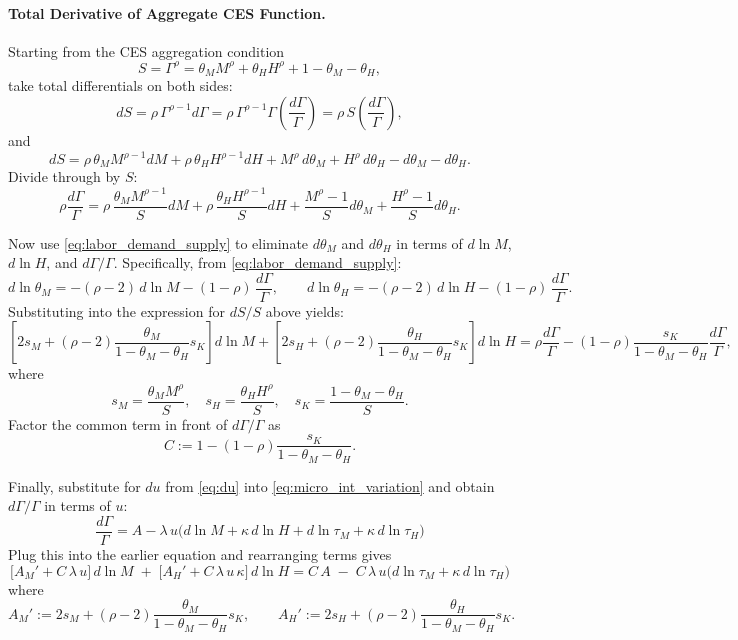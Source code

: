 \documentclass[english]{article}
\begin{document}
\paragraph{Total Derivative of Aggregate CES Function.}
Starting from the CES aggregation condition
\[
S = \Gamma^\rho = \theta_M M^\rho + \theta_H H^\rho + 1 - \theta_M - \theta_H,
\]
take total differentials on both sides:
\[
dS
= \rho\,\Gamma^{\rho-1} d\Gamma
= \rho\,\Gamma^{\rho-1} \Gamma \left( \frac{d\Gamma}{\Gamma} \right)
= \rho\,S \left( \frac{d\Gamma}{\Gamma} \right),
\]
and
\[
dS
= \rho\,\theta_M M^{\rho-1} dM + \rho\,\theta_H H^{\rho-1} dH
+ M^\rho\,d\theta_M + H^\rho\,d\theta_H - d\theta_M - d\theta_H.
\]
Divide through by \(S\):
\[
\rho \frac{d\Gamma}{\Gamma}
= \rho\,\frac{\theta_M M^{\rho-1}}{S} dM + \rho\,\frac{\theta_H H^{\rho-1}}{S} dH
+ \frac{M^\rho - 1}{S} d\theta_M + \frac{H^\rho - 1}{S} d\theta_H.
\]

Now use \eqref{eq:labor_demand_supply} to eliminate
\(d\theta_M\) and \(d\theta_H\) in terms of \(d\ln M\), \(d\ln H\), and \(d\Gamma/\Gamma\).  
Specifically, from \eqref{eq:labor_demand_supply}:
\begin{equation}
d\ln\theta_M = -(\rho-2)\,d\ln M - (1-\rho)\,\frac{d\Gamma}{\Gamma},
\qquad
d\ln\theta_H = -(\rho-2)\,d\ln H - (1-\rho)\,\frac{d\Gamma}{\Gamma}. \label{eq:d_theta}
\end{equation}
Substituting into the expression for \(dS/S\) above yields:
\[
\left[ 2s_M + (\rho-2)\frac{\theta_M}{1-\theta_M-\theta_H}s_K \right] d\ln M
+ \left[ 2s_H + (\rho-2)\frac{\theta_H}{1-\theta_M-\theta_H}s_K \right] d\ln H
= \rho\frac{d\Gamma}{\Gamma} - (1-\rho)\frac{s_K}{1-\theta_M-\theta_H} \frac{d\Gamma}{\Gamma},
\]
where 
\begin{equation}
s_M = \frac{\theta_M M^\rho}{S}, \quad
s_H = \frac{\theta_H H^\rho}{S}, \quad 
s_K = \frac{1-\theta_M-\theta_H}{S}. \label{eq:s_def}
\end{equation}
Factor the common term in front of \(d\Gamma/\Gamma\) as
\begin{equation}
C := 1 - (1-\rho)\frac{s_K}{1-\theta_M-\theta_H}. \label{eq:C_def}
\end{equation}

Finally, substitute for $du$ from \eqref{eq:du} into \eqref{eq:micro_int_variation} and obtain $d\Gamma/\Gamma$ in terms of $u$:
\[
\frac{d\Gamma}{\Gamma}
= 
A - \lambda\, u \Big(d\ln M + \kappa\,d\ln H + d\ln \tau_M + \kappa\,d\ln \tau_H\Big)
\]
Plug this into the earlier equation and rearranging terms gives
\begin{equation}
\boxed{
\big[A_M'+C\,\lambda\,u\big]\,d\ln M \;+\; \big[A_H'+C\,\lambda\,u\,\kappa\big]\,d\ln H
= C\,A \;-\; C\,\lambda\,u\Big(d\ln \tau_M + \kappa\,d\ln \tau_H\Big)}
\tag{A}\label{eq:A}
\end{equation}
where
\begin{equation}
A_M' := 2s_M + (\rho-2)\frac{\theta_M}{1-\theta_M-\theta_H}s_K,
\qquad
A_H' := 2s_H + (\rho-2)\frac{\theta_H}{1-\theta_M-\theta_H}s_K. \label{eq:Aprime_def}
\end{equation}
\end{document}
